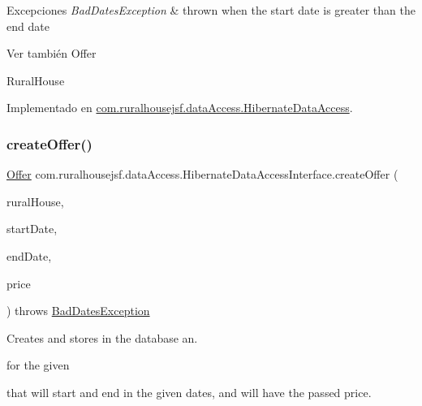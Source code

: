 \begin{DoxyExceptions}{Excepciones}
{\em Bad\+Dates\+Exception} & thrown when the start date is greater than the end date\\
\hline
\end{DoxyExceptions}
\begin{DoxySeeAlso}{Ver también}
Offer 

Rural\+House 
\end{DoxySeeAlso}


Implementado en \mbox{\hyperlink{a00144_a332f591a06df13d36814ff215008987b}{com.\+ruralhousejsf.\+data\+Access.\+Hibernate\+Data\+Access}}.

\mbox{\label{a00148_a31f9cb8a3c8f0b42dee19b03f052cd62}} 
\subsubsection{\texorpdfstring{createOffer()}{createOffer()}\hspace{0.1cm}{\footnotesize\ttfamily [2/2]}}
{\footnotesize\ttfamily \mbox{\hyperlink{a00184}{Offer}} com.\+ruralhousejsf.\+data\+Access.\+Hibernate\+Data\+Access\+Interface.\+create\+Offer (\begin{DoxyParamCaption}\item[{\mbox{\hyperlink{a00188}{Rural\+House}}}]{rural\+House,  }\item[{Date}]{start\+Date,  }\item[{Date}]{end\+Date,  }\item[{double}]{price }\end{DoxyParamCaption}) throws \mbox{\hyperlink{a00208}{Bad\+Dates\+Exception}}}



Creates and stores in the database an. 


\begin{DoxyCode}{0}
\end{DoxyCode}
 for the given
\begin{DoxyCode}{0}
\end{DoxyCode}
 that will start and end in the given dates, and will have the passed price.


